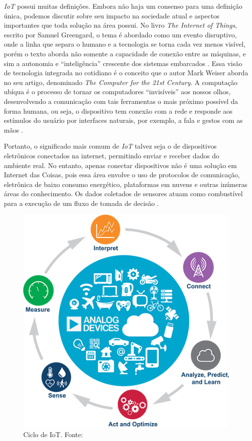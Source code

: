 \textit{IoT} possui muitas definições. Embora não haja um consenso para uma definição única, podemos discutir sobre seu impacto na sociedade atual e aspectos importantes que toda solução na área possui. No livro \textit{The Internet  of Things}, escrito por 
Samuel Greengard, o tema é abordado como um evento disruptivo, onde a linha que separa o humano e a tecnologia se torna cada vez menos visível, porém o texto aborda não somente a capacidade de conexão entre as máquinas, e sim a autonomia 
e ``inteligência'' crescente dos sistemas embarcados \cite[pp. 17]{book-iot}. Essa visão de tecnologia integrada no cotidiano é o conceito que o autor Mark Weiser aborda no seu artigo, denominado \textit{The Computer for the 21st Century}. A computação ubíqua 
é o processo de tornar os computadores ``invisíveis'' aos nossos olhos, desenvolvendo a comunicação com tais ferramentas o mais próximo possível da forma humana, ou seja, o dispositivo tem conexão com a rede e responde aos estímulos do usuário por 
interfaces naturais, por exemplo, a fala e gestos com as mãos \cite{ubiquitous-computing}.

Portanto, o significado mais comum de \textit{IoT} talvez seja o de dispositivos eletrônicos conectados na internet, permitindo 
enviar e receber dados do ambiente real. No entanto, apenas conectar dispositivos não é uma solução em Internet das Coisas, pois essa 
área envolve o uso de protocolos de comunicação, eletrônica de baixo consumo energético, plataformas em nuvens e outras inúmeras 
áreas do conhecimento. Os dados coletados de sensores atuam como combustível para a execução de um fluxo de tomada de decisão \cite{iot-cycle}. 

\begin{figure}[ht]
    \centering
    \includegraphics[width=.45\textwidth]{img/iot-cycle.png}
    \caption{Ciclo de IoT. Fonte:\cite{iot-cycle}}\label{figIoTCycle}
\end{figure}

